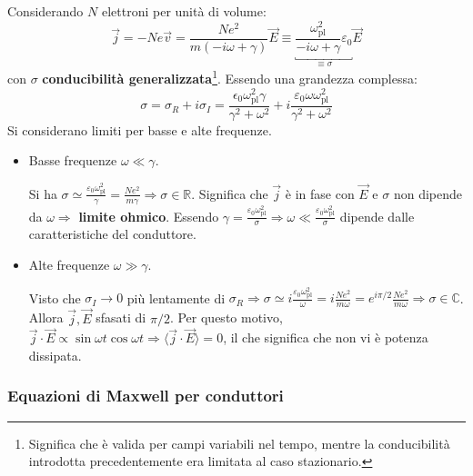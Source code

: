 \documentclass[10pt, a4paper]{scrartcl}
\numberwithin{equation}{subsection}
\theoremstyle{style1}
\begin{document}
Considerando $N$ elettroni per unit\`a di volume: 
\begin{equation}
	\vec{j}= - Ne \vec{v}= \frac{Ne^2}{m(-i\omega + \gamma)}\vec{E}\equiv \underbracket{\frac{\omega_\text{pl}^2}{-i\omega + \gamma}\varepsilon _0}_{\equiv \sigma }  \vec{E}
\end{equation}
con $\sigma $ \textbf{conducibilit\`a generalizzata}\footnote{Significa che \`e valida per campi variabili nel tempo, mentre la conducibilit\`a introdotta precedentemente era limitata al caso stazionario.}. Essendo una grandezza complessa:
\begin{equation}
	\sigma = \sigma _R + i \sigma _I = \frac{\epsilon _0 \omega_\text{pl}^2 \gamma}{\gamma^2 + \omega^2} + i \frac{\varepsilon _0 \omega \omega_\text{pl}^2}{\gamma^2 + \omega^2}
\end{equation}
Si considerano limiti per basse e alte frequenze.
\begin{itemize}
	\item Basse frequenze $\omega \ll \gamma$.

Si ha $ \sigma \simeq \frac{\varepsilon _0 \omega_\text{pl}^2}{\gamma} = \frac{Ne^2 }{m\gamma}\Rightarrow \sigma \in \mathbb{R}$. Significa che $\vec{j}$ \`e in fase con $\vec{E}$ e $\sigma $ non dipende da $\omega\Rightarrow $ \textbf{limite ohmico}. Essendo $\gamma=\frac{\varepsilon _0 \omega_\text{pl}^2}{\sigma }\Rightarrow \omega \ll \frac{\varepsilon _0 \omega_\text{pl}^2}{\sigma } $ dipende dalle caratteristiche del conduttore.

\item Alte frequenze $\omega \gg \gamma$.

	Visto che $\sigma _I \to 0 $ pi\`u lentamente di $\sigma _R\Rightarrow \sigma \simeq i \frac{\varepsilon _0 \omega_\text{pl}^2 }{\omega}=i \frac{Ne^2}{m\omega}= e^{i \pi / 2} \frac{Ne^2}{m\omega}\Rightarrow \sigma \in \mathbb{C}$. Allora $\vec{j}, \vec{E}$ sfasati di $\pi / 2$. Per questo motivo, $\vec{j}\cdot \vec{E}\propto \sin\omega t \cos\omega t \Rightarrow \langle \vec{j}\cdot \vec{E} \rangle=0$, il che significa che non vi \`e potenza dissipata.
\end{itemize}

\subsubsection{Equazioni di Maxwell per conduttori}
\end{document}
